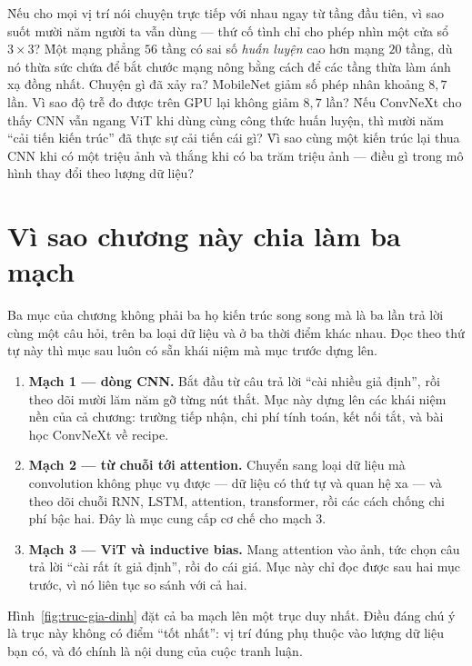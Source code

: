 \documentclass[../../deep_learning.tex]{subfiles}
\begin{document}
\begin{khoigoi}
\h{Nếu  cho mọi vị trí nói chuyện trực tiếp với nhau ngay từ tầng đầu tiên, vì sao suốt mười năm người ta vẫn dùng  --- thứ cố tình chỉ cho phép nhìn một cửa sổ \(3\times3\)?}
\h{Một mạng phẳng \(56\) tầng có sai số \emph{huấn luyện} cao hơn mạng \(20\) tầng, dù nó thừa sức chứa để bắt chước mạng nông bằng cách để các tầng thừa làm ánh xạ đồng nhất. Chuyện gì đã xảy ra?}
\h{MobileNet giảm số phép nhân khoảng \(8{,}7\) lần. Vì sao độ trễ đo được trên GPU lại không giảm \(8{,}7\) lần?}
\h{Nếu ConvNeXt cho thấy CNN vẫn ngang ViT khi dùng cùng công thức huấn luyện, thì mười năm ``cải tiến kiến trúc'' đã thực sự cải tiến cái gì?}
\h{Vì sao cùng một kiến trúc lại thua CNN khi có một triệu ảnh và thắng khi có ba trăm triệu ảnh --- điều gì trong mô hình thay đổi theo lượng dữ liệu?}
\end{khoigoi}

\section{Vì sao chương này chia làm ba mạch}
Ba mục của chương không phải ba họ kiến trúc song song mà là ba lần trả lời cùng một câu hỏi, trên ba loại dữ liệu và ở ba thời điểm khác nhau. Đọc theo thứ tự này thì mục sau luôn có sẵn khái niệm mà mục trước dựng lên.

\begin{enumerate}
\item \textbf{Mạch 1 --- dòng CNN.} Bắt đầu từ câu trả lời ``cài nhiều giả định'', rồi theo dõi mười lăm năm gỡ từng nút thắt. Mục này dựng lên các khái niệm nền của cả chương: trường tiếp nhận, chi phí tính toán, kết nối tắt, và bài học ConvNeXt về recipe.
\item \textbf{Mạch 2 --- từ chuỗi tới attention.} Chuyển sang loại dữ liệu mà convolution không phục vụ được --- dữ liệu có thứ tự và quan hệ xa --- và theo dõi chuỗi RNN, LSTM, attention, transformer, rồi các cách chống chi phí bậc hai. Đây là mục cung cấp cơ chế cho mạch 3.
\item \textbf{Mạch 3 --- ViT và inductive bias.} Mang attention vào ảnh, tức chọn câu trả lời ``cài rất ít giả định'', rồi đo cái giá. Mục này chỉ đọc được sau hai mục trước, vì nó liên tục so sánh với cả hai.
\end{enumerate}

Hình~\ref{fig:truc-gia-dinh} đặt cả ba mạch lên một trục duy nhất. Điều đáng chú ý là trục này không có điểm ``tốt nhất'': vị trí đúng phụ thuộc vào lượng dữ liệu bạn có, và đó chính là nội dung của cuộc tranh luận.
\end{document}
